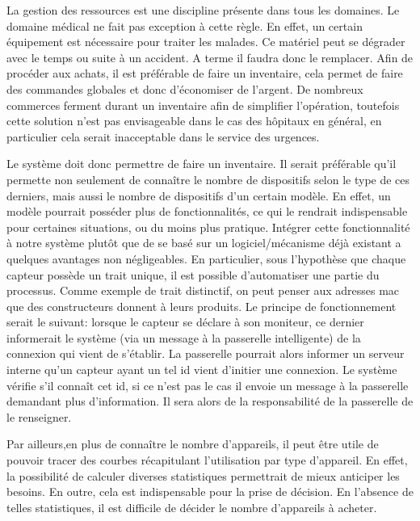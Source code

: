 La gestion des ressources est une discipline présente dans tous les domaines. Le domaine médical ne fait pas exception à cette
règle. En effet, un certain équipement est nécessaire pour traiter les malades. Ce matériel peut se dégrader avec le temps ou
suite à un accident. A terme il faudra donc le remplacer. Afin de procéder aux achats, il est préférable de faire un inventaire,
cela permet de faire des commandes globales et donc d'économiser de l'argent. De nombreux commerces ferment durant un inventaire
afin de simplifier l'opération, toutefois cette solution n'est pas envisageable dans le cas des hôpitaux en général, en
particulier cela serait inacceptable dans le service des urgences.  
\newline

Le système doit donc permettre de faire un inventaire. Il serait préférable qu'il permette non seulement de connaître le nombre de
dispositifs selon le type de ces derniers, mais aussi le nombre de dispositifs d'un certain modèle. En effet, un modèle pourrait
posséder plus de fonctionnalités, ce qui le rendrait indispensable pour certaines situations, ou du moins plus pratique. Intégrer
cette fonctionnalité à notre système plutôt que de se basé sur un logiciel/mécanisme déjà existant a quelques avantages non
négligeables. En particulier, sous l'hypothèse que chaque capteur possède un trait unique, il est possible d'automatiser une
partie du processus. Comme exemple de trait distinctif, on peut penser aux adresses mac que des constructeurs donnent à leurs
produits. Le principe de fonctionnement serait le suivant: lorsque le capteur se déclare à son moniteur, ce dernier informerait le
système (via un message à la passerelle intelligente) de la connexion qui vient de s'établir. La passerelle pourrait alors
informer un serveur interne qu'un capteur ayant un tel id vient d'initier une connexion. Le système vérifie s'il connaît cet id,
si ce n'est pas le cas il envoie un message à la passerelle demandant plus d'information. Il sera alors de la responsabilité de la
passerelle de le renseigner.  
\newline

Par ailleurs,en plus de connaître le nombre d'appareils, il peut être utile de pouvoir tracer des courbes récapitulant
l'utilisation par type d'appareil. En effet, la possibilité de calculer diverses statistiques permettrait de mieux anticiper les
besoins. En outre, cela est indispensable pour la prise de décision. En l'absence de telles statistiques, il est difficile de
décider le nombre d'appareils à acheter.  
\newline

